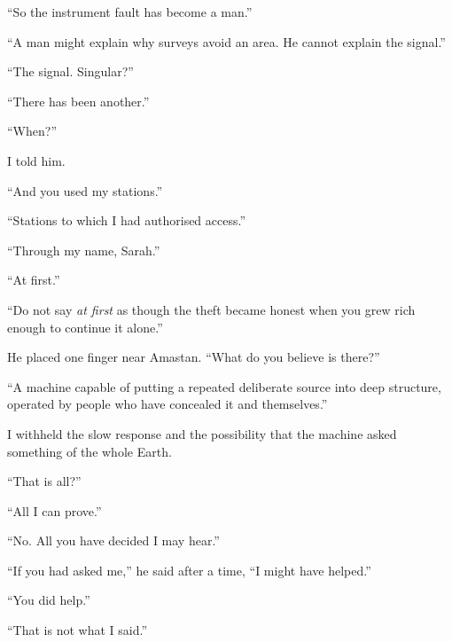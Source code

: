 “So the instrument fault has become a man.”\par

“A man might explain why surveys avoid an area. He cannot explain the signal.”\par

“The signal. Singular?”\par

“There has been another.”\par

“When?”\par

I told him.\par

“And you used my stations.”\par

“Stations to which I had authorised access.”\par

“Through my name, Sarah.”\par

“At first.”\par

“Do not say \emph{at first} as though the theft became honest when you grew rich enough to continue it alone.”\par

He placed one finger near Amastan. “What do you believe is there?”\par

“A machine capable of putting a repeated deliberate source into deep structure, operated by people who have concealed it and themselves.”\par

I withheld the slow response and the possibility that the machine asked something of the whole Earth.\par

“That is all?”\par

“All I can prove.”\par

“No. All you have decided I may hear.”\par

“If you had asked me,” he said after a time, “I might have helped.”\par

“You did help.”\par

“That is not what I said.”\par

